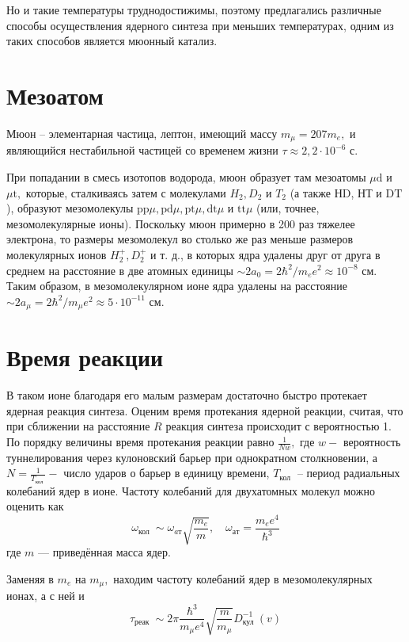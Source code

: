 \documentclass[12pt]{kiarticle} %
\begin{document}
Но и такие температуры труднодостижимы, поэтому предлагались различные способы осуществления ядерного синтеза при меньших температурах, одним из таких способов является мюонный катализ.

\section{Мезоатом}
Мюон -- элементарная частица, лептон, имеющий массу $m_{\mu}=207 m_{e},$ и являющийся нестабильной частицей со временем жизни $\tau \approx 2,2 \cdot 10^{-6} $ с. 

При попадании в смесь изотопов водорода, мюон образует там мезоатомы $\mu \mathrm{d}$ и $\mu \mathrm{t},$ которые, сталкиваясь затем с молекулами $H_{2}, D_{2}$ и $T_{2}$ (а также НD, НТ и $\mathrm{DT}$ ), образуют мезомолекулы $\mathrm{pp} \mu, \mathrm{pd} \mu, \mathrm{pt} \mu, \mathrm{dt} \mu$ и $\mathrm{tt} \mu$ (или, точнее, мезомолекулярные ионы). Поскольку мюон примерно в 200 раз тяжелее электрона, то размеры мезомолекул во столько же раз меньше размеров молекулярных ионов $H_{2}^{+}, D_{2}^{+}$ и т. д., в которых ядра удалены друг от друга в среднем на расстояние в две атомных единицы $\sim 2 a_{0}=2 \hbar^{2} / m_{e} e^{2} \approx 10^{-8}$ см. Таким образом, в мезомолекулярном ионе ядра удалены на расстояние $\sim 2 a_{\mu}=2 \hbar^{2} / m_{\mu} e^{2} \approx 5 \cdot 10^{-11}$ см.

\section{Время реакции}

В таком ионе благодаря его малым размерам достаточно быстро протекает ядерная реакция синтеза. Оценим время протекания ядерной реакции, считая, что при сближении на расстояние $R$ реакция синтеза происходит с вероятностью 1. По порядку величины время протекания реакции равно $\frac{1}{N w},$ где $w-$ вероятность туннелирования через кулоновский барьер при однократном столкновении, а $N=\frac{1}{T_{\text {кол }}}-$ число ударов о барьер в единицу времени, $T_{\text {кол }}$ -- период радиальных колебаний ядер в ионе. Частоту колебаний для двухатомных молекул можно оценить как
\begin{equation}
\omega_{\text {кол }} \sim \omega_{aт} \sqrt{\frac{m_{e}}{m}}, \quad \omega_{ат}=\frac{m_{e} e^{4}}{\hbar^{3}}
\end{equation}
где $m$ --- приведённая масса ядер. 

Заменяя в $m_{e}$ на $m_{\mu},$ находим частоту колебаний ядер в мезомолекулярных ионах, а с ней и
\begin{equation} 
\tau_{\text {реак }} \sim 2 \pi \frac{\hbar^{3}}{m_{\mu} e^{4}} \sqrt{\frac{m}{m_{\mu}}} D_{\text {кул }}^{-1}(v) 
\end{equation}
\end{document}

